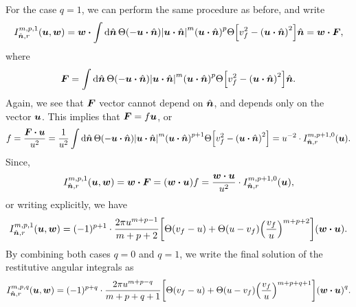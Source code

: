 \documentclass[aps,prl,preprint,groupedaddress,10pt]{revtex4-2}
\begin{document}
For the case $q=1$, we can perform the same procedure as before, and write
\begin{equation}
    I_{\bn,r}^{m,p,1}\pqty{\bu,\bw}=\bw\vdot\int\dd{\bn}\Theta\pqty{-\bu\vdot\bn}
    \abs{\bu\vdot\bn}^m\pqty{\bu\vdot\bn}^p
    \Theta\bqty{v_f^2-\pqty{\bu\vdot\bn}^2}\bn=\bw\vdot\bF,
\end{equation}
where
\begin{equation}
    \bF = \int\dd{\bn}\Theta\pqty{-\bu\vdot\bn}
    \abs{\bu\vdot\bn}^m\pqty{\bu\vdot\bn}^p
    \Theta\bqty{v_f^2-\pqty{\bu\vdot\bn}^2}\bn.
\end{equation}
Again, we see that $\vb*{F}$ vector cannot depend on $\hat{\vb*{n}}$, and depends only on the vector
$\vb*{u}$. This implies that $\vb*{F}=f\vb*{u}$, or
\begin{equation}
    f=\frac{\bF\vdot\bu}{u^2}=\frac{1}{u^2}\int\dd{\bn}\Theta\pqty{-\bu\vdot\bn}
    \abs{\bu\vdot\bn}^m\pqty{\bu\vdot\bn}^{p+1}
    \Theta\bqty{v_f^2-\pqty{\bu\vdot\bn}^2}=
    u^{-2}\cdot I_{\bn,r}^{m,p+1,0}(\bu).
\end{equation}
Since,
\begin{equation}
    I_{\bn,r}^{m,p,1}(\bu,\bw)=\bw\vdot\bF=\pqty{\bw\vdot\bu}f=
    \frac{\bw\vdot\bu}{u^2}\cdot I_{\bn,r}^{m,p+1,0}(\bu),
\end{equation}
or writing explicitly, we have
\begin{equation}
    I_{\bn,r}^{m,p,1}(\bu,\bw)=(-1)^{p+1}\cdot\frac{2\pi u^{m+p-1}}{m+p+2}
    \bqty{\Theta\pqty{v_f-u}+\Theta\pqty{u-v_f}
        \pqty{\frac{v_f}{u}}^{m+p+2}}\pqty{\bw\vdot\bu}.
\end{equation}
By combining both cases $q=0$ and $q=1$, we write the final solution of the
restitutive angular integrals as
\begin{equation}
    I_{\bn,r}^{m,p,q}(\bu,\bw)=(-1)^{p+q}\cdot\frac{2\pi u^{m+p-q}}{m+p+q+1}
    \bqty{\Theta\pqty{v_f-u}+\Theta\pqty{u-v_f}
        \pqty{\frac{v_f}{u}}^{m+p+q+1}}\pqty{\bw\vdot\bu}^q.
\end{equation}
\end{document}
